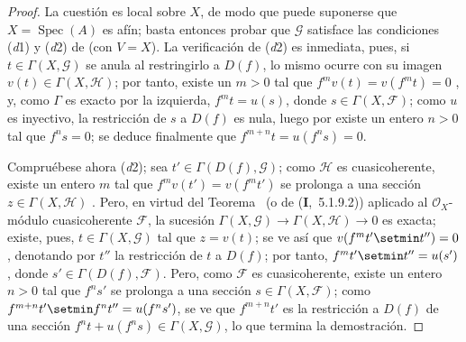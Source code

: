 \begin{proof}
La cuestión es local sobre $X$, de modo que puede suponerse que $X=\operatorname{Spec}(A)$ es afín; basta entonces probar que $\mathcal G$ satisface las condiciones (\textit{d}1) y (\textit{d}2) de  (con $V=X$).
La verificación de (\textit{d}2) es inmediata, pues, si $t\in\Gamma(X,\mathcal G)$ se anula al restringirlo a $D(f)$, lo mismo ocurre con su imagen $v(t)\in\Gamma(X,\mathcal H)$; por tanto, existe un $m>0$ tal que $f^mv(t)=v(f^mt)=0$ , y, como $\Gamma$ es exacto por la izquierda, $f^mt=u(s)$, donde $s\in\Gamma(X,\mathcal F)$; como $u$ es inyectivo, la restricción de $s$ a $D(f)$ es nula, luego por  existe un entero $n>0$ tal que $f^ns=0$; se deduce finalmente que $f^{m+n}t=u(f^ns)=0$.

Compruébese ahora (\textit{d}2); sea $t'\in\Gamma(D(f),\mathcal G)$; como $\mathcal H$ es cuasicoherente, existe un entero $m$ tal que $f^mv(t')=v(f^mt')$ se prolonga a una sección $z\in\Gamma(X,\mathcal H)$ .
Pero, en virtud del Teorema~ (o de (\textbf{I},~5.1.9.2)) aplicado al $\mathcal O_X$-módulo cuasicoherente $\mathcal F$, la sucesión $\Gamma(X,\mathcal G)\to\Gamma(X,\mathcal H)\to0$ es exacta; existe, pues, $t\in\Gamma(X,\mathcal G)$ tal que $z=v(t)$; se ve así que $v(f^mt'\setmin t'')=0$, denotando por $t''$ la restricción de $t$ a $D(f)$; por tanto, $f^mt'\setmin t''=u(s')$, donde $s'\in\Gamma(D(f),\mathcal F)$.
Pero, como $\mathcal F$ es cuasicoherente, existe un entero $n>0$ tal que $f^ns'$ se prolonga a una sección $s\in\Gamma(X,\mathcal F)$; como $f^{m+n}t'\setmin f^nt''=u(f^ns')$, se ve que $f^{m+n}t'$ es la restricción a $D(f)$ de una sección $f^nt+u(f^ns)\in\Gamma(X,\mathcal G)$, lo que termina la demostración.
\end{proof}
